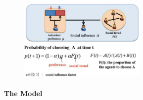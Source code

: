 \begin{figure}[h]
    \centering
    \includegraphics[width=0.55\textwidth]{Pictures/ABM_1.png}
\end{figure}

\paragraph{The Model}

